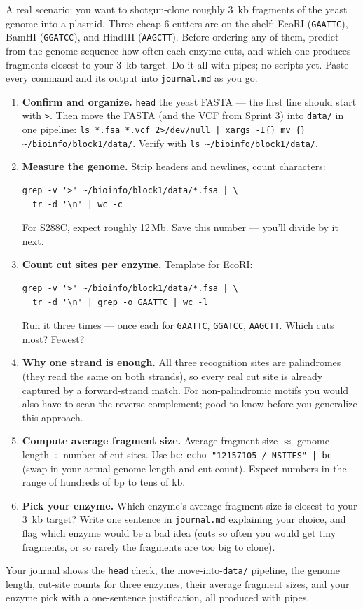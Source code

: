 A real scenario: you want to shotgun-clone roughly 3~kb fragments of the yeast genome into a plasmid. Three cheap 6-cutters are on the shelf: EcoRI (\texttt{GAATTC}), BamHI (\texttt{GGATCC}), and HindIII (\texttt{AAGCTT}). Before ordering any of them, predict from the genome sequence how often each enzyme cuts, and which one produces fragments closest to your 3~kb target. Do it all with pipes; no scripts yet. Paste every command and its output into \texttt{journal.md} as you go.
\begin{enumerate}[nosep]
  \item \textbf{Confirm and organize.} \texttt{head} the yeast FASTA --- the first line should start with \texttt{>}. Then move the FASTA (and the VCF from Sprint 3) into \texttt{data/} in one pipeline: \texttt{ls *.fsa *.vcf 2>/dev/null | xargs -I\{\} mv \{\} \textasciitilde/bioinfo/block1/data/}. Verify with \texttt{ls \textasciitilde/bioinfo/block1/data/}.
  \item \textbf{Measure the genome.} Strip headers and newlines, count characters:
    \begin{lstlisting}
grep -v '>' ~/bioinfo/block1/data/*.fsa | \
  tr -d '\n' | wc -c
    \end{lstlisting}
    For S288C, expect roughly 12\,Mb. Save this number --- you'll divide by it next.
  \item \textbf{Count cut sites per enzyme.} Template for EcoRI:
    \begin{lstlisting}
grep -v '>' ~/bioinfo/block1/data/*.fsa | \
  tr -d '\n' | grep -o GAATTC | wc -l
    \end{lstlisting}
    Run it three times --- once each for \texttt{GAATTC}, \texttt{GGATCC}, \texttt{AAGCTT}. Which cuts most? Fewest?
  \item \textbf{Why one strand is enough.} All three recognition sites are palindromes (they read the same on both strands), so every real cut site is already captured by a forward-strand match. For non-palindromic motifs you would also have to scan the reverse complement; good to know before you generalize this approach.
  \item \textbf{Compute average fragment size.} Average fragment size $\approx$ genome length $\div$ number of cut sites. Use \texttt{bc}: \texttt{echo "12157105 / NSITES" | bc} (swap in your actual genome length and cut count). Expect numbers in the range of hundreds of bp to tens of kb.
  \item \textbf{Pick your enzyme.} Which enzyme's average fragment size is closest to your 3~kb target? Write one sentence in \texttt{journal.md} explaining your choice, and flag which enzyme would be a bad idea (cuts so often you would get tiny fragments, or so rarely the fragments are too big to clone).
\end{enumerate}
\begin{winbox}[Checkpoint]
Your journal shows the \texttt{head} check, the move-into-\texttt{data/} pipeline, the genome length, cut-site counts for three enzymes, their average fragment sizes, and your enzyme pick with a one-sentence justification, all produced with pipes.
\end{winbox}

